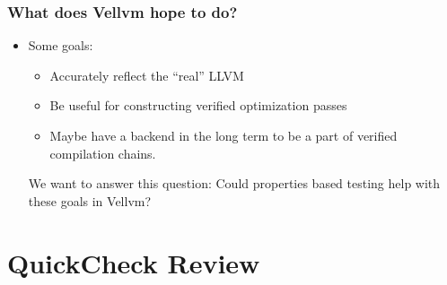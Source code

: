 \documentclass{beamer}
\begin{document}
\begin{frame}
  \frametitle{What does Vellvm hope to do?}

  \begin{itemize}
  \item Some goals:
    \begin{itemize}
    \item Accurately reflect the ``real'' LLVM
    \item Be useful for constructing verified optimization passes
    \item Maybe have a backend in the long term to be a part of
      verified compilation chains.
    \end{itemize}

    We want to answer this question:
    Could properties based testing help with these goals in Vellvm?
  \end{itemize}
\end{frame}

\section{QuickCheck Review}
\end{document}
